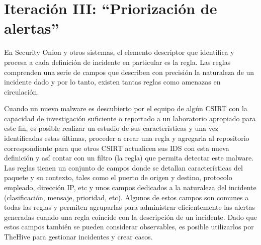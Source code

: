 \chapter{\Large Iteración III: “Priorización de alertas”}
    En Security Onion y otros sistemas, el elemento descriptor que identifica y procesa a cada definición de incidente en particular es la regla. Las reglas comprenden una serie de campos que describen con precisión la naturaleza de un incidente dado y por lo tanto, existen tantas reglas como amenazas en circulación. \par
    Cuando un nuevo malware es descubierto por el equipo de algún CSIRT con la capacidad de investigación suficiente o reportado a un laboratorio apropiado para este fin, es posible realizar un estudio de sus características y una vez identificadas estas últimas, proceder a crear una regla y agregarla al repositorio correspondiente para que otros CSIRT actualicen sus IDS con esta nueva definición y así contar con un filtro (la regla) que permita detectar este malware. Las reglas tienen un conjunto de campos donde se detallan características del paquete y su contexto, tales como el puerto de origen y destino, protocolo empleado, dirección IP, etc y unos campos dedicados a la naturaleza del incidente (clasificación, mensaje, prioridad, etc). Algunos de estos campos son comunes a todas las reglas y permiten agruparlas para administrar eficientemente las alertas generadas cuando una regla coincide con la descripción de un incidente. Dado que estos campos también se pueden considerar observables, es posible utilizarlos por TheHive para gestionar incidentes y crear casos. \par

